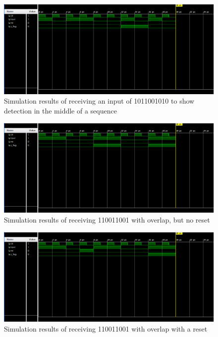 \documentclass[12pt,a4paper]{article}
\begin{document}
\begin{figure}[H]
    \centering
    \includegraphics[scale=0.25]{images/10_sequence.png}
    \caption{Simulation results of receiving an input of 1011001010 to show detection in the middle of a sequence}
    \label{fig:10_sequence}
\end{figure}

\begin{figure}[H]
    \centering
    \includegraphics[scale=0.25]{images/overlap_no_reset.png}
    \caption{Simulation results of receiving 110011001 with overlap, but no reset}
    \label{fig:overlap_no_reset}
\end{figure}

\begin{figure}[H]
    \centering
    \includegraphics[scale=0.25]{images/overlap_reset.png}
    \caption{Simulation results of receiving 110011001 with overlap with a reset}
    \label{fig:overlap_reset}
\end{figure}
\end{document}
